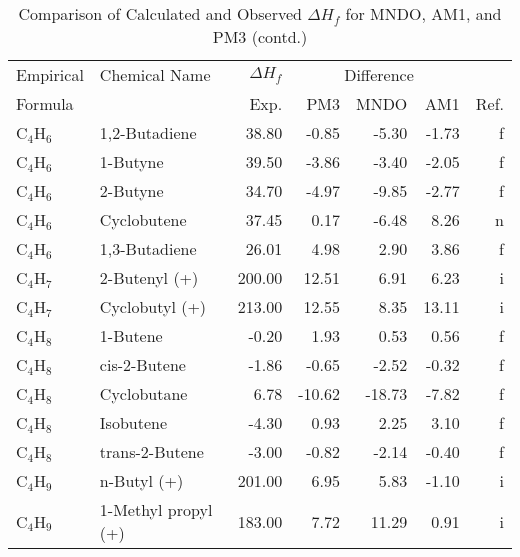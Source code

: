 \begin{table}
\caption{Comparison of Calculated and Observed $\Delta H_f$ 
for MNDO, AM1, and PM3 (contd.)}
\begin{center}
\compresstable
\begin{tabular}{llrrrrr}
Empirical & Chemical Name & $\Delta H_f$ & \multicolumn{3}{c}{Difference} & \\
Formula   &               & Exp. & PM3 &  MNDO  &  AM1 &     Ref.\\
\hline
 C$_4$H$_6$        & 1,2-Butadiene                  &    38.80    &    -0.85  &    -5.30  &    -1.73  &      f\\
 C$_4$H$_6$        & 1-Butyne                       &    39.50    &    -3.86  &    -3.40  &    -2.05  &      f\\
 C$_4$H$_6$        & 2-Butyne                       &    34.70    &    -4.97  &    -9.85  &    -2.77  &      f\\
 C$_4$H$_6$        & Cyclobutene                    &    37.45    &     0.17  &    -6.48  &     8.26  &      n\\
 C$_4$H$_6$        & 1,3-Butadiene                  &    26.01    &     4.98  &     2.90  &     3.86  &      f\\
 C$_4$H$_7$        & 2-Butenyl (+)                  &   200.00    &    12.51  &     6.91  &     6.23  &      i\\
 C$_4$H$_7$        & Cyclobutyl (+)                 &   213.00    &    12.55  &     8.35  &    13.11  &      i\\
 C$_4$H$_8$        & 1-Butene                       &    -0.20    &     1.93  &     0.53  &     0.56  &      f\\
 C$_4$H$_8$        & cis-2-Butene                   &    -1.86    &    -0.65  &    -2.52  &    -0.32  &      f\\
 C$_4$H$_8$        & Cyclobutane                    &     6.78    &   -10.62  &   -18.73  &    -7.82  &      f\\
 C$_4$H$_8$        & Isobutene                      &    -4.30    &     0.93  &     2.25  &     3.10  &      f\\
 C$_4$H$_8$        & trans-2-Butene                 &    -3.00    &    -0.82  &    -2.14  &    -0.40  &      f\\
 C$_4$H$_9$        & n-Butyl (+)                    &   201.00    &     6.95  &     5.83  &    -1.10  &      i\\
 C$_4$H$_9$        & 1-Methyl propyl (+)            &   183.00    &     7.72  &    11.29  &     0.91  &      i\\

\end{tabular}
\end{center}
\end{table}
